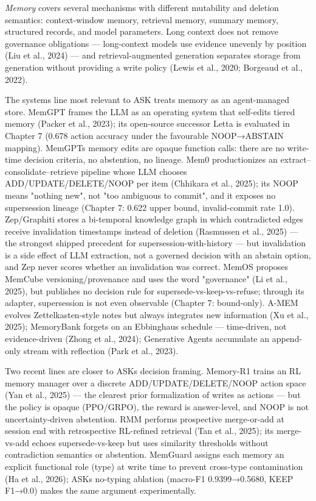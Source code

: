 \emph{Memory} covers several mechanisms with different mutability and
deletion semantics: context-window memory, retrieval memory, summary
memory, structured records, and model parameters. Long context does not
remove governance obligations --- long-context models use evidence
unevenly by position (Liu et al., 2024) --- and retrieval-augmented
generation separates storage from generation without providing a write
policy (Lewis et al., 2020; Borgeaud et al., 2022).

The systems line most relevant to ASK treats memory as an agent-managed
store. MemGPT frames the LLM as an operating system that self-edits
tiered memory (Packer et al., 2023); its open-source successor Letta is
evaluated in Chapter 7 (0.678 action accuracy under the favourable
NOOP→ABSTAIN mapping). MemGPT\textquotesingle s memory edits are opaque
function calls: there are no write-time decision criteria, no
abstention, no lineage. Mem0 productionizes an
extract--consolidate--retrieve pipeline whose LLM chooses
ADD/UPDATE/DELETE/NOOP per item (Chhikara et al., 2025); its NOOP means
"nothing new", not "too ambiguous to commit", and it exposes no
supersession lineage (Chapter 7: 0.622 upper bound, invalid-commit rate
1.0). Zep/Graphiti stores a bi-temporal knowledge graph in which
contradicted edges receive invalidation timestamps instead of deletion
(Rasmussen et al., 2025) --- the strongest shipped precedent for
supersession-with-history --- but invalidation is a side effect of LLM
extraction, not a governed decision with an abstain option, and Zep
never scores whether an invalidation was correct. MemOS proposes MemCube
versioning/provenance and uses the word "governance" (Li et al., 2025),
but publishes no decision rule for supersede-vs-keep-vs-refuse; through
its adapter, supersession is not even observable (Chapter 7:
bound-only). A-MEM evolves Zettelkasten-style notes but always
integrates new information (Xu et al., 2025); MemoryBank forgets on an
Ebbinghaus schedule --- time-driven, not evidence-driven (Zhong et al.,
2024); Generative Agents accumulate an append-only stream with
reflection (Park et al., 2023).

Two recent lines are closer to ASK\textquotesingle s decision framing.
Memory-R1 trains an RL memory manager over a discrete
ADD/UPDATE/DELETE/NOOP action space (Yan et al., 2025) --- the clearest
prior formalization of writes as actions --- but the policy is opaque
(PPO/GRPO), the reward is answer-level, and NOOP is not
uncertainty-driven abstention. RMM performs prospective merge-or-add at
session end with retrospective RL-refined retrieval (Tan et al., 2025);
its merge-vs-add echoes supersede-vs-keep but uses similarity thresholds
without contradiction semantics or abstention. MemGuard assigns each
memory an explicit functional role (type) at write time to prevent
cross-type contamination (Ha et al., 2026); ASK\textquotesingle s
no-typing ablation (macro-F1 0.9399→0.5680, KEEP F1→0.0) makes the same
argument experimentally.

